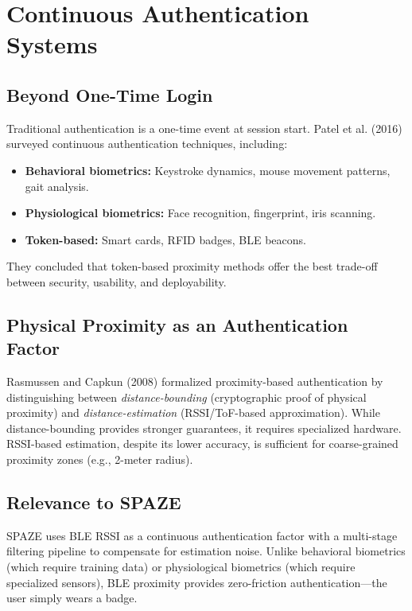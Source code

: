 \documentclass[conference]{IEEEtran}
\begin{document}
\section{Continuous Authentication Systems}
\label{sec:continuous}

\subsection{Beyond One-Time Login}
Traditional authentication is a one-time event at session start. Patel et al. (2016) \cite{patel2016} surveyed continuous authentication techniques, including:
\begin{itemize}[noitemsep]
    \item \textbf{Behavioral biometrics:} Keystroke dynamics, mouse movement patterns, gait analysis.
    \item \textbf{Physiological biometrics:} Face recognition, fingerprint, iris scanning.
    \item \textbf{Token-based:} Smart cards, RFID badges, BLE beacons.
\end{itemize}
They concluded that token-based proximity methods offer the best trade-off between security, usability, and deployability.

\subsection{Physical Proximity as an Authentication Factor}
Rasmussen and Capkun (2008) \cite{rasmussen2009} formalized proximity-based authentication by distinguishing between \textit{distance-bounding} (cryptographic proof of physical proximity) and \textit{distance-estimation} (RSSI/ToF-based approximation). While distance-bounding provides stronger guarantees, it requires specialized hardware. RSSI-based estimation, despite its lower accuracy, is sufficient for coarse-grained proximity zones (e.g., 2-meter radius).

\subsection{Relevance to SPAZE}
SPAZE uses BLE RSSI as a continuous authentication factor with a multi-stage filtering pipeline to compensate for estimation noise. Unlike behavioral biometrics (which require training data) or physiological biometrics (which require specialized sensors), BLE proximity provides zero-friction authentication—the user simply wears a badge.
\end{document}
